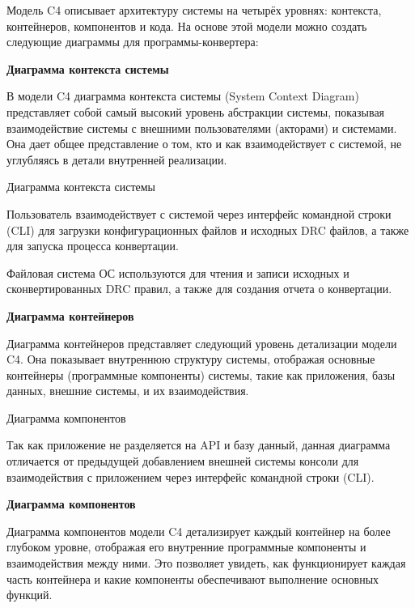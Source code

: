 
Модель C4 описывает архитектуру системы на четырёх уровнях:
контекста, контейнеров, компонентов и кода.
На основе этой модели можно создать следующие диаграммы
для программы-конвертера:

\textbf{Диаграмма контекста системы}

В модели C4 диаграмма контекста системы (System Context Diagram)
представляет собой самый высокий уровень абстракции системы,
показывая взаимодействие системы с внешними пользователями (акторами)
и системами. Она дает общее представление о том,
кто и как взаимодействует с системой,
не углубляясь в детали внутренней реализации.
   
\begin{image}
	\caption{Диаграмма контекста системы}
	\label{fig:c4:system:context}
\end{image}

Пользователь взаимодействует с системой через интерфейс командной строки (CLI)
для загрузки конфигурационных файлов и исходных DRC файлов,
а также для запуска процесса конвертации.\par
Файловая система ОС используются для чтения и записи исходных
и сконвертированных DRC правил, а также для создания отчета о конвертации.

\textbf{Диаграмма контейнеров}

Диаграмма контейнеров представляет следующий уровень детализации модели C4.
Она показывает внутреннюю структуру системы,
отображая основные контейнеры (программные компоненты) системы,
такие как приложения, базы данных, внешние системы, и их взаимодействия.
   
\begin{image}
	\caption{Диаграмма компонентов}
	\label{fig:c4:container}
\end{image}

Так как приложение не разделяется на API и базу данный,
данная диаграмма отличается от предыдущей добавлением внешней системы
консоли для взаимодействия с приложением
через интерфейс командной строки (CLI).

\textbf{Диаграмма компонентов}

Диаграмма компонентов модели C4 детализирует
каждый контейнер на более глубоком уровне,
отображая его внутренние программные компоненты и взаимодействия между ними.
Это позволяет увидеть, как функционирует каждая часть контейнера
и какие компоненты обеспечивают выполнение основных функций.

